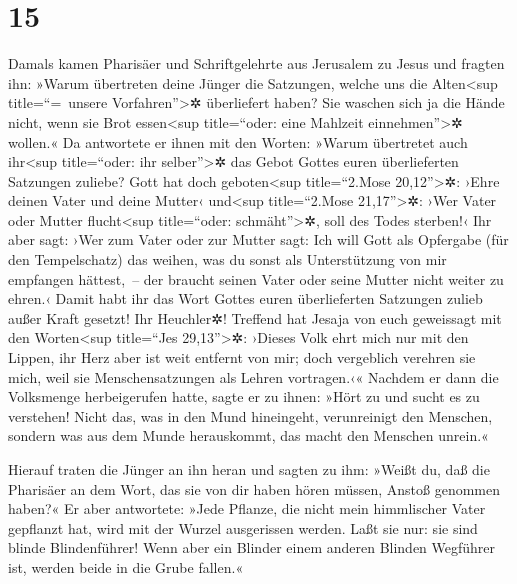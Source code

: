 \hypertarget{section-14}{%
\section{15}\label{section-14}}

 Damals kamen Pharisäer und Schriftgelehrte aus Jerusalem
zu Jesus und fragten ihn:  »Warum übertreten deine Jünger
die Satzungen, welche uns die Alten\textless sup title=``=~unsere
Vorfahren''\textgreater✲ überliefert haben? Sie waschen sich ja die
Hände nicht, wenn sie Brot essen\textless sup title=``oder: eine
Mahlzeit einnehmen''\textgreater✲ wollen.«  Da antwortete
er ihnen mit den Worten: »Warum übertretet auch ihr\textless sup
title=``oder: ihr selber''\textgreater✲ das Gebot Gottes euren
überlieferten Satzungen zuliebe?  Gott hat doch
geboten\textless sup title=``2.Mose 20,12''\textgreater✲: ›Ehre deinen
Vater und deine Mutter‹ und\textless sup title=``2.Mose
21,17''\textgreater✲: ›Wer Vater oder Mutter flucht\textless sup
title=``oder: schmäht''\textgreater✲, soll des Todes sterben!‹
 Ihr aber sagt: ›Wer zum Vater oder zur Mutter sagt: Ich
will Gott als Opfergabe (für den Tempelschatz) das weihen, was du sonst
als Unterstützung von mir empfangen hättest,~--  der
braucht seinen Vater oder seine Mutter nicht weiter zu ehren.‹ Damit
habt ihr das Wort Gottes euren überlieferten Satzungen zulieb außer
Kraft gesetzt!  Ihr Heuchler✲! Treffend hat Jesaja von
euch geweissagt mit den Worten\textless sup title=``Jes
29,13''\textgreater✲:  ›Dieses Volk ehrt mich nur mit den
Lippen, ihr Herz aber ist weit entfernt von mir;  doch
vergeblich verehren sie mich, weil sie Menschensatzungen als Lehren
vortragen.‹«  Nachdem er dann die Volksmenge
herbeigerufen hatte, sagte er zu ihnen: »Hört zu und sucht es zu
verstehen!  Nicht das, was in den Mund hineingeht,
verunreinigt den Menschen, sondern was aus dem Munde herauskommt, das
macht den Menschen unrein.«

 Hierauf traten die Jünger an ihn heran und sagten zu
ihm: »Weißt du, daß die Pharisäer an dem Wort, das sie von dir haben
hören müssen, Anstoß genommen haben?«  Er aber
antwortete: »Jede Pflanze, die nicht mein himmlischer Vater gepflanzt
hat, wird mit der Wurzel ausgerissen werden.  Laßt sie
nur: sie sind blinde Blindenführer! Wenn aber ein Blinder einem anderen
Blinden Wegführer ist, werden beide in die Grube fallen.«

